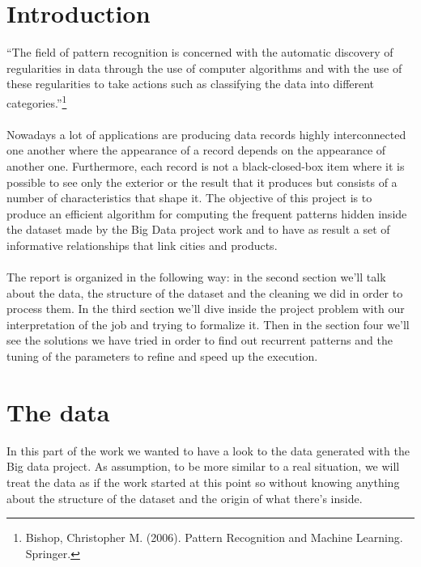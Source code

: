 \documentclass{acm_proc_article-sp-sigmod09}
\begin{document}
	\section{Introduction}
	``The field of pattern recognition is concerned with the automatic discovery of regularities in data through the use of computer algorithms and with the use of these regularities to take actions such as classifying the data into different categories.''\footnote{Bishop, Christopher M. (2006). Pattern Recognition and Machine Learning. Springer.}
	\\
	\\
	Nowadays a lot of applications are producing data records highly interconnected one another where the appearance of a record depends on the appearance of another one. Furthermore, each record is not a black-closed-box item where it is possible to see only the exterior or the result that it produces but consists of a number of characteristics that shape it. The objective of this project is to produce an efficient algorithm for computing the frequent patterns hidden inside the dataset made by the Big Data project work and to have as result a set of informative relationships that link cities and products.
	\\
	\\
	The report is organized in the following way: in the second section we'll talk about the data, the structure of the dataset and the cleaning we did in order to process them. In the third section we'll dive inside the project problem with our interpretation of the job and trying to formalize it. Then in the section four we'll see the solutions we have tried in order to find out recurrent patterns and the tuning of the parameters to refine and speed up the execution.
	
	\section{The data}
	In this part of the work we wanted to have a look to the data generated with the Big data project. As assumption, to be more similar to a real situation, we will treat the data as if the work started at this point so without knowing anything about the structure of the dataset and the origin of what there's inside.
	
\end{document}
